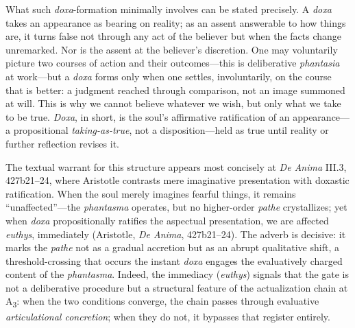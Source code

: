 \documentclass{article}
\begin{document}
What such \textit{doxa}-formation minimally involves can be stated precisely. A \textit{doxa} takes an appearance as bearing on reality; as an assent answerable to how things are, it turns false not through any act of the believer but when the facts change unremarked. Nor is the assent at the believer's discretion. One may voluntarily picture two courses of action and their outcomes---this is deliberative \textit{phantasia} at work---but a \textit{doxa} forms only when one settles, involuntarily, on the course that is better: a judgment reached through comparison, not an image summoned at will. This is why we cannot believe whatever we wish, but only what we take to be true. \textit{Doxa}, in short, is the soul's affirmative ratification of an appearance---a propositional \textit{taking-as-true}, not a disposition---held as true until reality or further reflection revises it.

The textual warrant for this structure appears most concisely at \textit{De Anima} III.3, 427b21--24, where Aristotle contrasts mere imaginative presentation with doxastic ratification. When the soul merely imagines fearful things, it remains ``unaffected''---the \textit{phantasma} operates, but no higher-order \textit{pathe} crystallizes; yet when \textit{doxa} propositionally ratifies the aspectual presentation, we are affected \textit{euthys}, immediately (Aristotle, \textit{De Anima}, 427b21--24). The adverb is decisive: it marks the \textit{pathe} not as a gradual accretion but as an abrupt qualitative shift, a threshold-crossing that occurs the instant \textit{doxa} engages the evaluatively charged content of the \textit{phantasma}. Indeed, the immediacy (\textit{euthys}) signals that the gate is not a deliberative procedure but a structural feature of the actualization chain at A\textsubscript{3}: when the two conditions converge, the chain passes through evaluative \textit{articulational concretion}; when they do not, it bypasses that register entirely.
\end{document}

